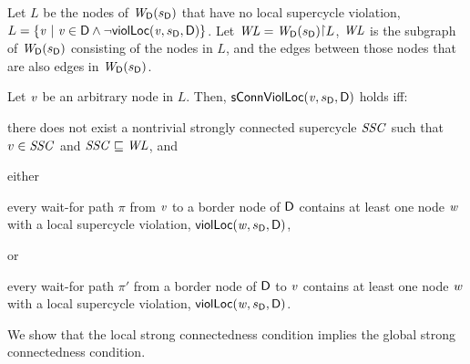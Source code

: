 \begin{definition}
\label{def:sConn.violation.loc}
\label{defn:sConn.violation.loc}

Let $L$ be the nodes of $\wfg{\dsk{a}{\l}}{\sD}$ that have no local supercycle violation, \ie
 $L = \set{ \ndv \stt \ndv \in \dsk{a}{\l} \land \neg \scVL{\ndv}{\sD}{\act}{\l} }$.
%
Let $\WL = \wfg{\dsk{a}{\l}}{\sD} \pj L$, \ie $\WL$ is the subgraph of $\wfg{\dsk{a}{\l}}{\sD}$ consisting of the
nodes in $L$, and the edges between those nodes that are also edges in $\wfg{\dsk{a}{\l}}{\sD}$.

Let $\ndv$ be an arbitrary node in $L$.  Then, $\locConnViol{\ndv}{\sD}{\act}{\l}$ holds iff:
\bn

\item \label{def:sConn.violation.loc:scc}
there does not exist a nontrivial strongly connected supercycle $\SSC$ such that $v \in \SSC$ and $\SSC \subg \WL$, and


\item \label{def:sConn.violation.border}
either
    \bn

    \item \label{def:sConn.violation.loc:wait-for-out} every wait-for path $\pi$ from $\ndv$ to a border node
      of $\dsk{a}{\l}$ contains at least one node $\ndw$ with a local supercycle violation, \ie $\scVL{\ndw}{\sD}{\act}{\l}$,

     or

    \item \label{def:sConn.violation.loc:wait-for-in} every wait-for path $\pi'$ from a border node
      of $\dsk{a}{\l}$ to $\ndv$ contains at least one node $\ndw$ with a
      local supercycle violation,  \ie $\scVL{\ndw}{\sD}{\act}{\l}$.

    \en

\en
\end{definition}


We show that the local strong connectedness condition implies the global strong connectedness condition.

